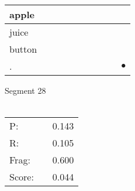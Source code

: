 \documentclass[landscape]{article}
\newcommand{\ssp}{\hspace{2pt}}
\newcommand{\mex}{\cellcolor{g}$\bullet$}
\begin{document}
\begin{tabular}{|l|p{10pt}|p{10pt}|p{10pt}|p{10pt}|p{10pt}|p{10pt}|p{10pt}|p{10pt}|p{10pt}|}
\hline
\ssp apple \ssp&\hspace{2pt}&\hspace{2pt}&\hspace{2pt}&\hspace{2pt}&\hspace{2pt}&\hspace{2pt}&\hspace{2pt}&\hspace{2pt}&\hspace{2pt}\\
\hline
\ssp juice \ssp&\hspace{2pt}&\hspace{2pt}&\hspace{2pt}&\hspace{2pt}&\hspace{2pt}&\hspace{2pt}&\hspace{2pt}&\hspace{2pt}&\hspace{2pt}\\
\hline
\ssp button \ssp&\hspace{2pt}&\hspace{2pt}&\hspace{2pt}&\hspace{2pt}&\hspace{2pt}&\hspace{2pt}&\hspace{2pt}&\hspace{2pt}&\hspace{2pt}\\
\hline
\ssp \cellcolor{ref8}. \ssp&\hspace{2pt}&\hspace{2pt}&\hspace{2pt}&\hspace{2pt}&\hspace{2pt}&\hspace{2pt}&\hspace{2pt}&\hspace{2pt}&\hspace{2pt}\mex\\
\hline
\end{tabular}

\vspace{6pt}
\noindent Segment 28\\\\
\noindent\begin{tabular}{lm{12pt}r}
\hline
P:&&0.143\\
R:&&0.105\\
Frag:&&0.600\\
Score:&&0.044\\
\end{tabular}
\end{document}
